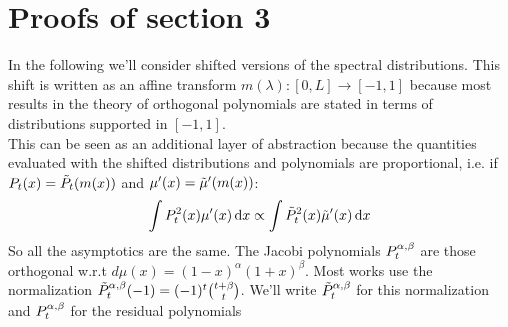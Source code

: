 \documentclass{article}
\begin{document}
\section{Proofs of section 3}
In the following we'll consider shifted versions of the spectral distributions. This shift is written as an affine transform $m(\lambda):[0,L]\rightarrow [-1,1]$ because most results in the theory of orthogonal polynomials are stated in terms of distributions supported in $[-1,1]$. \\
This can be seen as an additional layer of abstraction because the quantities evaluated with the shifted distributions and polynomials are proportional, i.e. if $P_t(x)=\Tilde{P}_t(m(x))$ and $\mu'(x)=\Tilde{\mu}'(m(x))$:
\begin{equation}
    \int P_t^2(x)\mu'(x)\mathop{}\!\mathrm{d} x\propto \int \Tilde{P}_t^2(x)\Tilde{\mu}'(x)\mathop{}\!\mathrm{d} x
\end{equation}
So all the asymptotics are the same. The Jacobi polynomials $P^{\alpha,\beta}_t$ are those orthogonal w.r.t $d\mu(x)=(1-x)^\alpha(1+x)^\beta$. Most works use the  normalization $\Tilde{P}_t^{\alpha,\beta}(-1)=(-1)^t\binom{t+\beta}{t}$. We'll write $\Tilde{P}^{\alpha,\beta}_t$ for this normalization and $P^{\alpha,\beta}_t$ for the residual polynomials
\robustjacobi*
\end{document}
